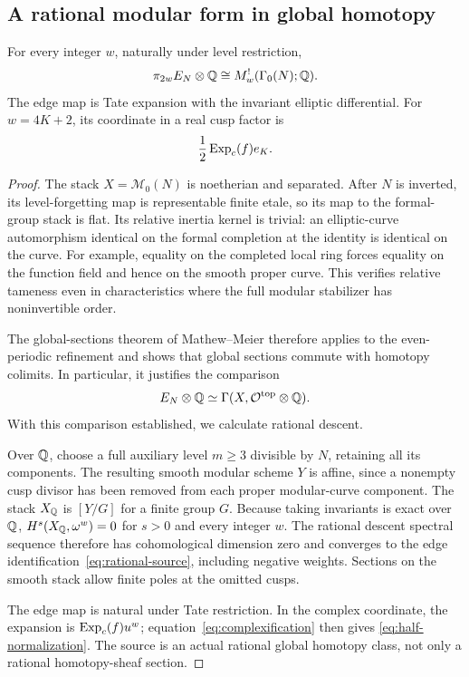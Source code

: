 \subsection{A rational modular form in global homotopy}
\begin{lemma}\label{lem:rational-source}
For every integer $w$, naturally under level restriction,
\begin{equation}\label{eq:rational-source}
 \pi_{2w}E_N\otimes\mathbb Q
 \cong M_w^!(\Gamma_0(N);\mathbb Q).
\end{equation}
The edge map is Tate expansion with the invariant elliptic differential.
For $w=4K+2$, its coordinate in a real cusp factor is
\begin{equation}\label{eq:half-normalization}
 \frac12\operatorname{Exp}_c(f)e_K.
\end{equation}
\end{lemma}
\begin{proof}
The stack $X=\mathcal M_0(N)$ is noetherian and separated. After $N$
is inverted, its level-forgetting map is representable finite etale,
so its map to the formal-group stack is flat. Its relative inertia
kernel is trivial: an elliptic-curve automorphism identical on the
formal completion at the identity is identical on the curve.
For example, equality on the completed local ring forces equality
on the function field and hence on the smooth proper curve. This
verifies relative tameness even in characteristics where the full
modular stabilizer has noninvertible order.

The global-sections theorem of Mathew--Meier
\cite[Definition~2.28 and Theorem~4.14]{MM} therefore applies to the
even-periodic refinement and shows that global sections commute with
homotopy colimits. In particular, it justifies the comparison
\[
 E_N\otimes\mathbb Q\simeq\Gamma(X,\mathcal O^{\mathrm{top}}\otimes\mathbb Q).
\]
With this comparison established, we calculate rational descent.

Over $\mathbb Q$, choose a full auxiliary level $m\ge3$ divisible by $N$,
retaining all its components. The resulting smooth modular scheme
$Y$ is affine, since a nonempty cusp divisor has been removed from
each proper modular-curve component. The stack $X_{\mathbb Q}$ is $[Y/G]$
for a finite group $G$. Because taking invariants is exact over $\mathbb Q$,
$H^s(X_{\mathbb Q},\omega^w)=0$ for $s>0$ and every integer $w$.
The rational descent spectral sequence therefore has cohomological
dimension zero and converges to the edge
identification~\eqref{eq:rational-source}, including negative weights.
Sections on the smooth stack allow finite poles at the omitted cusps.

The edge map is natural under Tate restriction. In the complex
coordinate, the expansion is $\operatorname{Exp}_c(f)u^w$;
equation~\eqref{eq:complexification} then gives
\eqref{eq:half-normalization}. The source is an actual rational global
homotopy class, not only a rational homotopy-sheaf section.
\end{proof}

